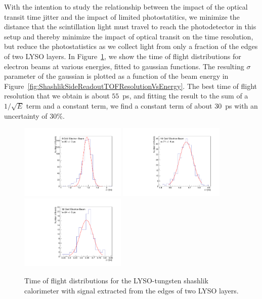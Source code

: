 \documentclass[12pt]{article}
\begin{document}
With the intention to study the relationship between the impact of the 
optical transit time jitter and the impact of limited photostatitics,
we minimize the distance that the scintillation light
must travel to reach the photodetector in this setup and thereby minimize the
impact of optical transit on the time resolution, but reduce the photostatistics 
as we collect light from only a fraction of the edges of two LYSO layers. 
In Figure~\ref{fig:ShashlikSideReadoutTOF}, we show the 
time of flight distributions for electron beams at various energies, 
fitted to gaussian functions. The resulting
$\sigma$ parameter of the gaussian is plotted as a function of the
beam energy in Figure~\ref{fig:ShashlikSideReadoutTOFResolutionVsEnergy}.
The best time of flight resolution that we obtain is about $55$~ps, and
fitting the result to the sum of a $1/\sqrt{E}$ term and a constant term,
we find a constant term of about $30$~ps with an uncertainty of $30\%$. 

\begin{figure}[h] \centering
\includegraphics[width=0.45\textwidth]{figs/TOF_ShashlikSideReadout_Electron_8GeV} 
\includegraphics[width=0.45\textwidth]{figs/TOF_ShashlikSideReadout_Electron_16GeV} 
\includegraphics[width=0.45\textwidth]{figs/TOF_ShashlikSideReadout_Electron_32GeV} 
\caption{ Time of flight distributions for the LYSO-tungsten shashlik calorimeter
with signal extracted from the edges of two LYSO layers. } 
\label{fig:ShashlikSideReadoutTOF}
\end{figure}
\end{document}
